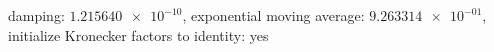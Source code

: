damping: $\num[scientific-notation=true]{1.215640e-10}$, exponential moving average: $\num[scientific-notation=true]{9.263314e-01}$, initialize Kronecker factors to identity: yes